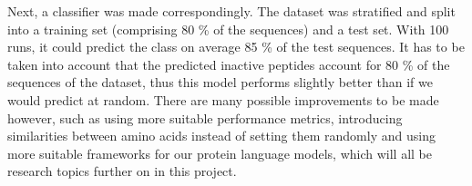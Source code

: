 Next, a classifier was made correspondingly. The dataset was stratified and split into a training set (comprising 80 \% of the sequences) and a test set. With 100 runs, it could predict the class on average 85 \% of the test sequences. It has to be taken into account that the predicted inactive peptides account for 80 \% of the sequences of the dataset, thus this model performs slightly better than if we would predict at random. There are many possible improvements to be made however, such as using more suitable performance metrics, introducing similarities between amino acids instead of setting them randomly and using more suitable frameworks for our protein language models, which will all be research topics further on in this project.